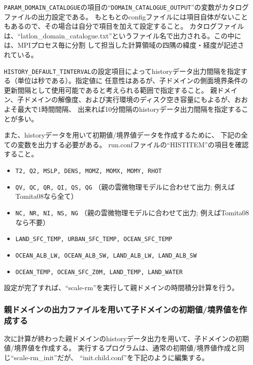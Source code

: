 \verb|PARAM_DOMAIN_CATALOGUE|の項目の``\verb|DOMAIN_CATALOGUE_OUTPUT|''の変数がカタログファイルの出力設定である。
もともとのconfigファイルには項目自体がないこともあるので、その場合は自分で項目を加えて設定すること。
カタログファイルは、``latlon\_domain\_catalogue.txt''というファイル名で出力される。この中には、MPIプロセス毎に分割
して担当した計算領域の四隅の緯度・経度が記述されている。

\verb|HISTORY_DEFAULT_TINTERVAL|の設定項目によってhistoryデータ出力間隔を指定する（単位は秒である）。指定値に
任意性はあるが、子ドメインの側面境界条件の更新間隔として使用可能であると考えられる範囲で指定すること。
親ドメイン、子ドメインの解像度、および実行環境のディスク空き容量にもよるが、おおよそ最大で1時間間隔、
出来れば10分間隔のhistoryデータ出力間隔を指定することが多い。

また、historyデータを用いて初期値/境界値データを作成するために、
下記の全ての変数を出力する必要がある。
run.confファイルの``HISTITEM''の項目を確認すること。

\begin{itemize}
 \item \verb|T2, Q2, MSLP, DENS, MOMZ, MOMX, MOMY, RHOT|
 \item \verb|QV, QC, QR, QI, QS, QG| {\small （親の雲微物理モデルに合わせて出力; 例えばTomita08なら全て）}
 \item \verb|NC, NR, NI, NS, NG| {\small （親の雲微物理モデルに合わせて出力; 例えばTomita08なら不要）}
 \item \verb|LAND_SFC_TEMP, URBAN_SFC_TEMP, OCEAN_SFC_TEMP|
 \item \verb|OCEAN_ALB_LW, OCEAN_ALB_SW, LAND_ALB_LW, LAND_ALB_SW|
 \item \verb|OCEAN_TEMP, OCEAN_SFC_Z0M, LAND_TEMP, LAND_WATER|
\end{itemize}

設定が完了すれば、``scale-rm''を実行して親ドメインの時間積分計算を行う。


\subsubsection{親ドメインの出力ファイルを用いて子ドメインの初期値/境界値を作成する}
次に計算が終わった親ドメインのhistoryデータ出力を用いて、子ドメインの初期値/境界値を作成する。
実行するプログラムは、通常の初期値/境界値作成と同じ``scale-rm\_init''だが、
``init.child.conf''を下記のように編集する。\\

